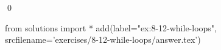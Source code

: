 
\begin{ex}
  \label{ex:8-12-while-loops}
  
  \qed
\end{ex}
\begin{python0}
from solutions import *
add(label="ex:8-12-while-loops",
    srcfilename='exercises/8-12-while-loops/answer.tex')
\end{python0}
